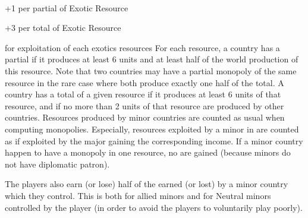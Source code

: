 ~\\
\begin{modlist}
\item[+1] per partial  of Exotic Resource
\item[+3] per total  of Exotic Resource
\end{modlist}

\label{chVictories:MonopolyExoticResources} for exploitation of each
exotics resources
\bparag For each resource, a country has a partial  if
it produces at least 6 units and at least half of the world production
of this resource. Note that two countries may have a partial monopoly of
the same resource in the rare case where both produce exactly one half
of the total.
\bparag A country has a total  of a given resource if it
produces at least 6 units of that resource, and if no more than 2 units
of that resource are produced by other countries.
\bparag Resources produced by minor countries are counted as usual when
computing monopolies. Especially, resources exploited by a minor in
\dipAT are counted as if exploited by the major gaining the
corresponding income.
\bparag If a \ROTW minor country happen to have a monopoly
in one resource, no \VPs are gained (because \ROTW minors do not have
diplomatic patron).

The players also earn (or lose) half of the \VPs earned (or lost) by a minor
country which they control.
\bparag This is both for allied minors and for Neutral minors controlled by
the player (in order to avoid the players to voluntarily play poorly).

